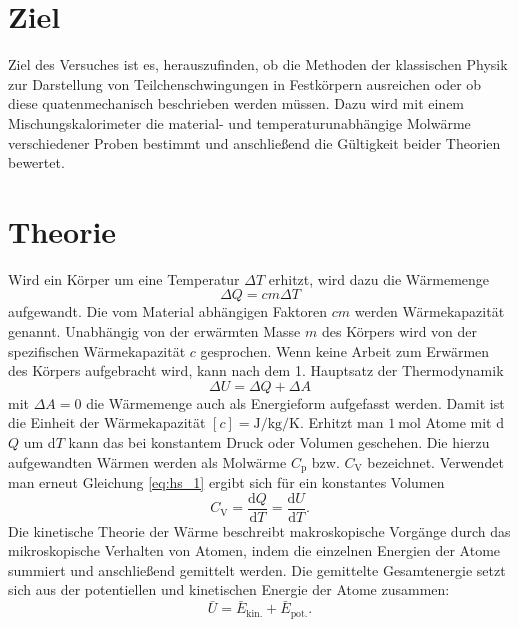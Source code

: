 \section{Ziel}

Ziel des Versuches ist es, herauszufinden, ob die Methoden der klassischen Physik zur Darstellung von Teilchenschwingungen in Festkörpern ausreichen oder ob diese quatenmechanisch beschrieben werden müssen. Dazu wird mit einem Mischungskalorimeter die material- und temperaturunabhängige Molwärme verschiedener Proben bestimmt und anschließend die Gültigkeit beider Theorien bewertet.
\section{Theorie}
\label{sec:Theorie}

Wird ein Körper  um eine Temperatur $\Delta{T}$ erhitzt, wird dazu die Wärmemenge 
\begin{equation}
\Delta{Q}=c m \Delta{T}
\label{eq:waermekapazitaet}
\end{equation}
aufgewandt. Die vom Material abhängigen Faktoren $c m$ werden Wärmekapazität genannt. 
Unabhängig von der erwärmten Masse $m$ des Körpers wird von der spezifischen Wärmekapazität $c$ gesprochen.
Wenn keine Arbeit zum Erwärmen des Körpers aufgebracht wird, kann nach dem 1. Hauptsatz der Thermodynamik
\begin{equation}
	\Delta{U}=\Delta{Q}+\Delta{A}
	\label{eq:hs_1}
\end{equation}
mit $\Delta{A}=0$ die Wärmemenge auch als Energieform aufgefasst werden. 
Damit ist die Einheit der Wärmekapazität $[c]=\si{\joule\per\kilo\gram\per\kelvin}$.
Erhitzt man $\SI{1}{\mol}$ Atome mit d$Q$ um d$T$ kann das bei konstantem Druck oder Volumen geschehen.
Die hierzu aufgewandten Wärmen werden als Molwärme $C_\mathup{p}$ bzw. $C_\mathup{V}$ bezeichnet. 
Verwendet man erneut Gleichung \eqref{eq:hs_1} 
ergibt sich für ein konstantes Volumen 
\begin{equation}
	C_\mathup{V}=\frac{\mathup{d}{Q}}{\mathup{d}{T}}=\frac{\mathup{d}{U}}{\mathup{d}{T}}.
	\label{eq:molwaerme}
\end{equation}
Die kinetische Theorie der Wärme beschreibt makroskopische Vorgänge durch das mikroskopische Verhalten von Atomen, indem die einzelnen Energien der Atome summiert und anschließend gemittelt werden. 
Die gemittelte Gesamtenergie setzt sich aus der potentiellen und kinetischen Energie der Atome zusammen:
\begin{equation}
	\bar{U}=\bar{E}_\mathup{kin.}+\bar{E}_\mathup{pot.}.
	\label{eq:innere_Energie}
\end{equation}
